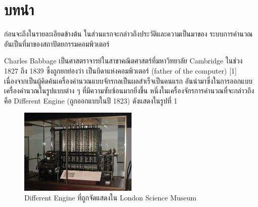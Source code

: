 \chapter{บทนำ}

\par{
ก่อนจะถึงในรายละเอียดข้างต้น 
ในส่วนแรกจะกล่าวถึงประวัติและความเป็นมาของ
ระบบการคำนวณอันเป็นที่มาของสถาปัตยกรรมคอมพิวเตอร์
}

\par{
Charles Babbage เป็นศาสตราจารย์ในสาขาคณิตศาสตร์ที่มหาวิทยาลัย 
Cambridge ในช่วง 1827 ถึง 1839 ซึ่งถูกยกย่องว่า
เป็นบิดาแห่งคอมพิวเตอร์ (father of the computer) [1] 
เนื่องจากเป็นผู้คิดค้นเครื่องคำนวณแบบจักรกลเป็นผลสำเร็จเป็นคนแรก อันนำมาซึ่งในการออกแบบเครื่องคำนวณในรูปแบบต่าง ๆ ที่มีความซับซ้อนมากยิ่งขึ้น หนึ่งในเครื่องจักรการคำนวณที่จะกล่าวถึงคือ Different Engine (ถูกออกแบบในปี 1823) ดังแสดงในรูปที่ 1
}

\begin{figure}[h]
\caption{Different Engine ที่ถูกจัดแสดงใน London Science Museum}
\centering
\includegraphics[width=0.5\textwidth]{fig/Babbage_Difference_Engine.png}
\end{figure}

